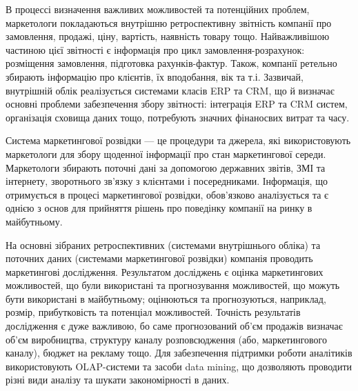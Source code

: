 В процессі визначення важливих можливостей та потенційних проблем, маркетологи покладаються внутрішню ретроспективну звітність компанії про замовлення, продажі, ціну, вартість, наявність товару тощо. Найважливішою частиною цієї звітності є інформація про цикл замовлення-розрахунок: розміщення замовлення, підготовка рахунків-фактур. Також, компанії ретельно збирають інформацію про клієнтів, їх вподобання, вік та т.і. Зазвичай, внутрішній облік реалізується системами класів ERP та CRM, що й визначає основні проблеми забезпечення збору звітності: інтеграція ERP та CRM систем, організація сховища даних тощо, потребують значних фінаносвих витрат та часу.

Система маркетингової розвідки --- це процедури та джерела, які використовують маркетологи для збору щоденної інформації про стан маркетингової середи\cite{kotler14}. Маркетологи збирають поточні дані за допомогою державних звітів, ЗМІ та інтернету, зворотнього зв’язку з клієнтами і посередниками. Інформація, що отримується в процесі маркетингової розвідки, обов’язково аналізується та є однією з основ для прийняття рішень про поведінку компанії на ринку в майбутньому.

На основні зібраних ретроспективних (системами внутрішнього обліка) та поточних даних (системами маркетингової розвідки) компанія проводить маркетингові дослідження. Результатом досліджень є оцінка маркетингових можливостей, що були використані та прогнозування можливостей, що можуть бути використані в майбутньому; оцінюються та прогнозуються, наприклад, розмір, прибутковість та потенціал можливостей. Точність результатів дослідження є дуже важливою, бо саме прогнозований об’єм продажів визначає об’єм виробництва, структуру каналу розповсюдження (або, маркетингового каналу), бюджет на рекламу тощо. Для забезпечення підтримки роботи аналітиків використовують OLAP-системи та засоби data mining, що дозволяють проводити різні види аналізу та шукати закономірності в даних.
 

